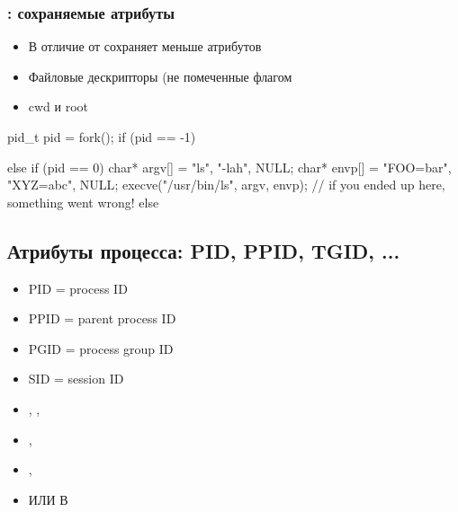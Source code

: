   \subsubsection{: сохраняемые атрибуты}
    \begin{itemize}
      \item В отличие от  сохраняет меньше атрибутов
      \item Файловые дескрипторы (не помеченные флагом 
      \item cwd и root
    \end{itemize}
  
\begin{cminted}
pid_t pid = fork();
if (pid == -1) {
  
} else if (pid == 0) {
  char* argv[] = {"ls", "-lah", NULL};
  char* envp[] = {"FOO=bar", "XYZ=abc", NULL};
  execve("/usr/bin/ls", argv, envp);
  // if you ended up here, something went wrong!
} else {

}
\end{cminted}

  \subsection{Атрибуты процесса: PID, PPID, TGID, ...}
    \begin{itemize}
      \item PID = process ID
      \item PPID = parent process ID
      \item PGID = process group ID
      \item SID = session ID
      \item {}, , 
      \item {}, 
      \item {}, 
      \item {} ИЛИ В 
    \end{itemize}

